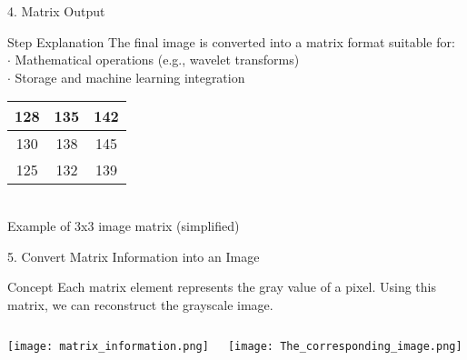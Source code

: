 \documentclass{beamer}
\begin{document}
\begin{frame}{4. Matrix Output}
    \begin{block}{Step Explanation}
        The final image is converted into a matrix format suitable for: \\
        $\boldsymbol{\cdot}$ Mathematical operations (e.g., wavelet transforms) \\
        $\boldsymbol{\cdot}$ Storage and machine learning integration
    \end{block}

    \vspace{1cm}
    \centering
    \begin{tabular}{|c|c|c|}
        \hline
        128 & 135 & 142 \\
        \hline
        130 & 138 & 145 \\
        \hline
        125 & 132 & 139 \\
        \hline
    \end{tabular} \\
    \vspace{0.5cm}
    \small{Example of 3x3 image matrix (simplified)}
\end{frame}

\begin{frame}{5. Convert Matrix Information into an Image}
    \begin{block}{Concept}
        Each matrix element represents the gray value of a pixel. Using this matrix, we can reconstruct the grayscale image.
    \end{block}

    \vspace{0.3cm}
    \begin{columns}
        \centering
        \texttt{[image: matrix\_information.png]}

        \centering
        \texttt{[image: The\_corresponding\_image.png]}
    \end{columns}
\end{frame}
\end{document}
